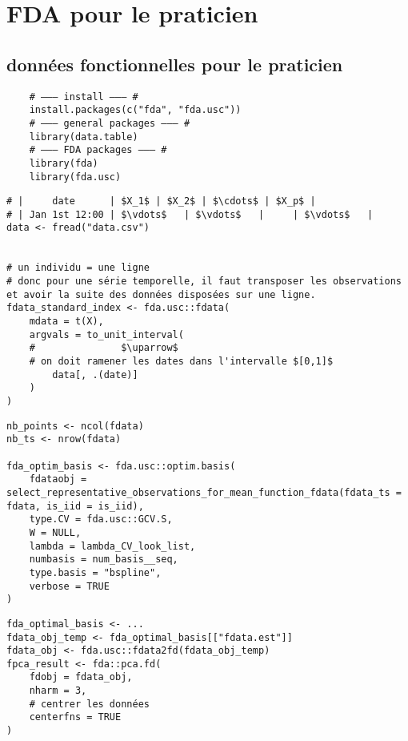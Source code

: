 \chapter{FDA pour le praticien}

\section*{données fonctionnelles pour le praticien}


\begin{verbatim}
    # ——— install ——— #
    install.packages(c("fda", "fda.usc"))
    # ——— general packages ——— #
    library(data.table)
    # ——— FDA packages ——— #
    library(fda)
    library(fda.usc)
\end{verbatim}


\begin{verbatim} 
# |     date      | $X_1$ | $X_2$ | $\cdots$ | $X_p$ |
# | Jan 1st 12:00 | $\vdots$   | $\vdots$   |     | $\vdots$   |
data <- fread("data.csv")


# un individu = une ligne
# donc pour une série temporelle, il faut transposer les observations et avoir la suite des données disposées sur une ligne.
fdata_standard_index <- fda.usc::fdata(
    mdata = t(X),
    argvals = to_unit_interval(
    #               $\uparrow$
    # on doit ramener les dates dans l'intervalle $[0,1]$
        data[, .(date)]
    )
)
\end{verbatim}

\begin{verbatim}
nb_points <- ncol(fdata)
nb_ts <- nrow(fdata)
 
fda_optim_basis <- fda.usc::optim.basis(
    fdataobj = select_representative_observations_for_mean_function_fdata(fdata_ts = fdata, is_iid = is_iid),
    type.CV = fda.usc::GCV.S,
    W = NULL,
    lambda = lambda_CV_look_list,
    numbasis = num_basis__seq,
    type.basis = "bspline",
    verbose = TRUE
)
\end{verbatim}


\begin{verbatim}
fda_optimal_basis <- ...
fdata_obj_temp <- fda_optimal_basis[["fdata.est"]]
fdata_obj <- fda.usc::fdata2fd(fdata_obj_temp)
fpca_result <- fda::pca.fd(
    fdobj = fdata_obj,
    nharm = 3,
    # centrer les données
    centerfns = TRUE
)
\end{verbatim}

